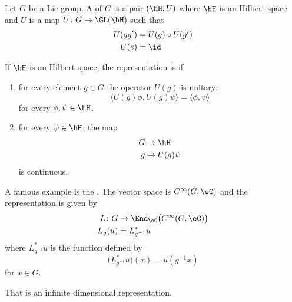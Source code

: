 Let $G$ be a Lie group. A  of $G$ is a pair $(\hH,U)$ where $\hH$ is an Hilbert space and $U$ is a map $U\colon G\to \GL(\hH)$ such that
\begin{equation}
	\begin{aligned}[]
		U(gg')&=U(g)\circ U(g')\\
		U(e)&=\id
	\end{aligned}
\end{equation}

\begin{definition}
	If $\hH$ is an Hilbert space, the representation is  if
	\begin{enumerate}

		\item
			for every element $g\in G$ the operator $U(g)$ is unitary:
			\begin{equation}
				\langle U(g)\phi, U(g)\psi\rangle =\langle \phi, \psi\rangle
			\end{equation}
			for every $\phi,\psi\in\hH$.

		\item
			for every $\psi\in\hH$, the map
			\begin{equation}
				\begin{aligned}
					G&\to \hH \\
					g&\mapsto U(g)\psi
				\end{aligned}
			\end{equation}
			is continuous.
	\end{enumerate}
\end{definition}

A famous example is the . The vector space is $ C^{\infty}(G,\eC)$ and the representation is given by
\begin{equation}
	\begin{aligned}
		L\colon G&\to \End_{\eC}\big(  C^{\infty}(G,\eC) \big) \\
		L_g(u)&=L_{g^{-1}}^*u
	\end{aligned}
\end{equation}
where $L_{g^{-1}}^*u$ is the function defined by
\begin{equation}
	\big(  L^*_{g^{-1}}u  \big)(x)=u(g^{-1}x)
\end{equation}
for $x\in G$.

That is an infinite dimensional representation.

